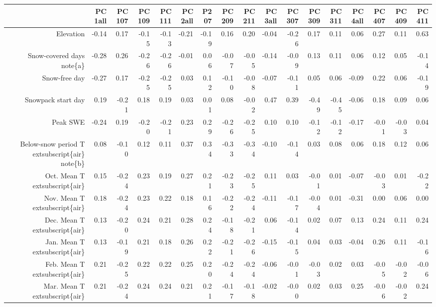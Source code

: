 \begin{table}[ht]
\centering
\begin{tabular}{rrrrrrrrrrrrrrrrr}
  \hline
 & PC1all & PC107 & PC109 & PC111 & PC2all & P207 & PC209 & PC211 & PC3all & PC307 & PC309 & PC311 & PC4all & PC407 & PC409 & PC411 \\ 
  \hline
Elevation & -0.14 & 0.17 & -0.15 & -0.13 & -0.21 & -0.19 & 0.16 & 0.20 & -0.04 & -0.26 & 0.17 & 0.11 & 0.06 & 0.27 & 0.11 & 0.63 \\ 
  Snow-covered days	note\{a\} & -0.28 & 0.26 & -0.26 & -0.26 & -0.01 & 0.06 & -0.07 & -0.05 & -0.14 & -0.09 & 0.13 & 0.11 & 0.06 & 0.12 & 0.05 & -0.14 \\ 
  Snow-free day & -0.27 & 0.17 & -0.25 & -0.25 & 0.03 & 0.12 & -0.10 & -0.08 & -0.07 & -0.11 & 0.05 & 0.06 & -0.09 & 0.22 & 0.06 & -0.19 \\ 
  Snowpack start day & 0.19 & -0.21 & 0.18 & 0.19 & 0.03 & 0.01 & 0.08 & -0.02 & 0.47 & 0.39 & -0.49 & -0.45 & -0.06 & 0.18 & 0.09 & 0.06 \\ 
  Peak SWE & -0.24 & 0.19 & -0.20 & -0.21 & 0.23 & 0.29 & -0.26 & -0.25 & 0.10 & 0.10 & -0.12 & -0.12 & -0.17 & -0.01 & -0.03 & 0.04 \\ 
  Below-snow period T	extsubscript\{air\}	note\{b\} & 0.08 & -0.10 & 0.12 & 0.11 & 0.37 & 0.34 & -0.33 & -0.34 & -0.10 & -0.14 & 0.03 & 0.08 & 0.06 & 0.18 & 0.12 & 0.06 \\ 
  Oct. Mean T	extsubscript\{air\} & 0.15 & -0.24 & 0.23 & 0.19 & 0.27 & 0.21 & -0.23 & -0.25 & 0.11 & 0.03 & -0.01 & 0.01 & -0.07 & -0.03 & 0.01 & -0.22 \\ 
  Nov. Mean T	extsubscript\{air\} & 0.18 & -0.24 & 0.23 & 0.22 & 0.18 & 0.16 & -0.22 & -0.24 & -0.11 & -0.17 & -0.04 & 0.01 & -0.31 & 0.00 & 0.06 & 0.00 \\ 
  Dec. Mean T	extsubscript\{air\} & 0.13 & -0.20 & 0.24 & 0.21 & 0.28 & 0.24 & -0.18 & -0.21 & 0.06 & -0.14 & 0.02 & 0.07 & 0.13 & 0.24 & 0.11 & 0.24 \\ 
  Jan. Mean T	extsubscript\{air\} & 0.13 & -0.19 & 0.21 & 0.18 & 0.26 & 0.22 & -0.21 & -0.26 & -0.15 & -0.15 & 0.04 & 0.03 & -0.04 & 0.26 & 0.11 & -0.16 \\ 
  Feb. Mean T	extsubscript\{air\} & 0.21 & -0.25 & 0.22 & 0.22 & 0.25 & 0.20 & -0.24 & -0.24 & -0.06 & -0.01 & -0.03 & 0.02 & 0.03 & -0.05 & -0.02 & -0.06 \\ 
  Mar. Mean T	extsubscript\{air\} & 0.21 & -0.24 & 0.24 & 0.24 & 0.21 & 0.21 & -0.17 & -0.18 & -0.02 & -0.00 & 0.02 & 0.03 & 0.25 & -0.06 & -0.02 & 0.24 \\ 

\end{tabular}
\end{table}
